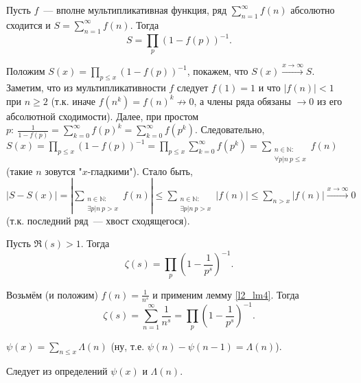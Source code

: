 
\begin{lemma} \label{l2_lm4}
	Пусть $f$ — вполне мультипликативная функция, ряд $\displaystyle \sum\limits_{n=1}^\infty f(n)$ абсолютно сходится и $\displaystyle S = \sum\limits_{n=1}^\infty f(n)$. Тогда
	$$S = \prod\limits_p(1-f(p))^{-1}.$$
\end{lemma}
\begin{pf}
	Положим $\displaystyle S(x) = \prod\limits_{p \leq x}(1-f(p))^{-1}$, покажем, что $S(x) \xrightarrow{x\to\infty} S$. Заметим, что из мультипликативности $f$ следует $f(1) = 1$ и что $|f(n)|<1$ при $n \geq 2$ (т.к. иначе $f(n^k)=f(n)^k \not \to 0$, а члены ряда обязаны $\to 0$ из его абсолютной сходимости). Далее, при простом $\displaystyle p: \ \frac{1}{1-f(p)} = \sum\limits_{k=0}^\infty f(p)^k = \sum\limits_{k=0}^\infty f(p^k)$. Следовательно, $\displaystyle S(x) = \prod\limits_{p\leq x} (1-f(p))^{-1} = \prod\limits_{p\leq x}\sum\limits_{k=0}^\infty f(p^k) = \sum\limits_{\substack{n\in\mathbb{N}: \\ \forall p|n \ p \leq x}}f(n)$ (такие $n$ зовутся "$x$-гладкими"). Стало быть, $\displaystyle \left|S-S(x)\right|=\left|\sum\limits_{\substack{n\in\mathbb{N}: \\ \exists p|n \ p > x}}f(n)\right| \leq \sum\limits_{\substack{n\in\mathbb{N}: \\ \exists p|n \ p > x}}\left|f(n)\right| \leq \sum\limits_{n>x}\left|f(n)\right| \xrightarrow{x\to\infty} 0$ (т.к. последний ряд — хвост сходящегося).
\end{pf}

\begin{theorem} \label{l2_Euler_formula}
	Пусть $\Re(s)>1$. Тогда $$\zeta(s) = \prod\limits_p\left( 1-\frac{1}{p^s}\right)^{-1}.$$
\end{theorem}
\begin{pf}
	Возьмём (и положим) $\displaystyle f(n) = \frac{1}{n^s}$ и применим лемму \ref{l2_lm4}. Тогда
		$$\zeta(s) = \sum\limits_{n=1}^\infty \frac{1}{n^s} = \prod\limits_p\left( 1-\frac{1}{p^s} \right)^{-1}.$$
\end{pf}

\begin{lemma} \label{l2_lm5}
	$\displaystyle \psi(x) = \sum\limits_{n \leq x} \Lambda(n)$ (ну, т.е. $\psi(n)-\psi(n-1)=\Lambda(n)$).
\end{lemma}
\begin{pf}
	Следует из определений $\psi(x)$ и $\Lambda(n)$.
\end{pf}
